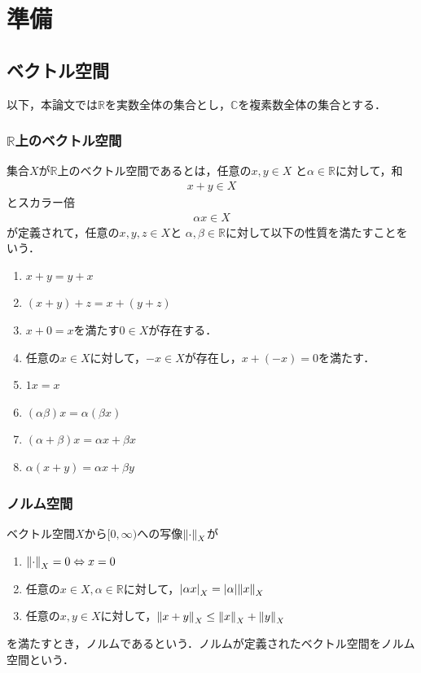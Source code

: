 \chapter{準備}\label{Preparation}
\section{ベクトル空間}
以下，本論文では\(\mathbb{R}\)を実数全体の集合とし，\(\mathbb{C}\)を複素数全体の集合とする．

\subsection{\(\mathbb{R}\)上のベクトル空間}
集合\(X\)が\(\mathbb{R}\)上のベクトル空間であるとは，任意の\(x,y \in X\)
と\(\alpha \in \mathbb{R}\)に対して，和
\begin{align}
    x+y\in X
\end{align}
とスカラー倍
\begin{align}
    \alpha x \in X
\end{align}
が定義されて，任意の\(x,y,z \in X\)と
\(\alpha,\beta \in \mathbb{R}\)に対して以下の性質を満たすことをいう．
\begin{enumerate}[1.]
    \item \( x+y =y+x   \)
    \item \( (x+y)+z =x+(y+z)  \)
    \item \(x+0=x\)を満たす\(0 \in X\)が存在する．
    \item 任意の\(x \in X\)に対して，\(-x \in X\)が存在し，\(x+(-x)=0\)を満たす．
    \item \(1x=x\)
    \item \((\alpha \beta)x=\alpha(\beta x)\)
    \item \((\alpha+\beta)x=\alpha x +\beta x\)
    \item \(\alpha(x+y)=\alpha x+\beta y\)
\end{enumerate}
\subsection{ノルム空間}
ベクトル空間\(X\)から\([0,\infty)\)への写像\(\norm{\cdot}_X\)が
\begin{enumerate}[1.]
    \item \(\norm{\cdot}_X=0\Leftrightarrow x = 0\)
    \item 任意の\(x \in X,\alpha \in \mathbb{R}\)に対して，\({|\alpha x|}_X={|\alpha|\norm{x}}_X\)
    \item 任意の\(x,y\in X\)に対して，\({\norm{x+y}}_X\leq{\norm{x}}_X+{\norm{y}}_X\)
\end{enumerate}
を満たすとき，ノルムであるという．ノルムが定義されたベクトル空間をノルム空間という．

